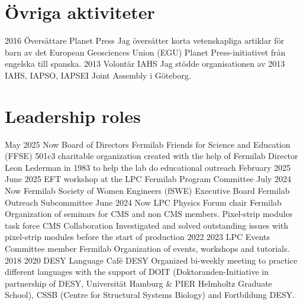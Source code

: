 \ifswedish
  \section{Övriga aktiviteter}
    \position
      {2016 \textemdash{}}
      {Översättare}
      {Planet Press}
      {Jag översätter korta vetenskapliga artiklar för barn av det European Geosciences Union (EGU) Planet Press-initiativet från engelska till spanska.}
    \position
      {2013}
      {Volontär}
      {IAHS}
      {Jag stödde organisationen av 2013 IAHS, IAPSO, IAPSEI Joint Assembly i Göteborg.}
\else
  \section{Leadership roles}
    \position
      {May 2025 \textemdash{} Now} 
      {Board of Directors}
      {Fermilab Friends for Science and Education (FFSE)}
      {501c3 charitable organization created with the help of Fermilab Director Leon Lederman in 1983 to help the lab do educational outreach}
  	\position
      {February 2025 \textemdash{} June 2025} 
      {EFT workshop at the LPC}
      {Fermilab}
      {Program Committee}
     \position
      {July 2024 \textemdash{} Now} 
      {Fermilab Society of Women Engineers (fSWE) Executive Board}
      {Fermilab}
      {Outreach Subcommittee}
     \position
      {June 2024 \textemdash{} Now} 
      {LPC Physics Forum chair}
      {Fermilab}
      {Organization of seminars for CMS and non CMS members.}
      {Pixel-strip modules task force}
      {CMS Collaboration}
      {Investigated and solved outstanding issues with pixel-strip modules before the start of production}
     \position
      {2022 \textemdash{} 2023} 
      {LPC Events Committee member}
      {Fermilab}
      {Organization of events, workshops and tutorials.}
    \position
      {2018 \textemdash{} 2020} 
      {DESY Language Café}
      {DESY}
      {Organized bi-weekly meeting to practice different languages with the support of DOIT (Doktoranden-Initiative in partnership of DESY, Universität Hamburg \&  PIER Helmholtz Graduate School), CSSB (Centre for Structural Systems Biology) and Fortbildung DESY.}
\fi
